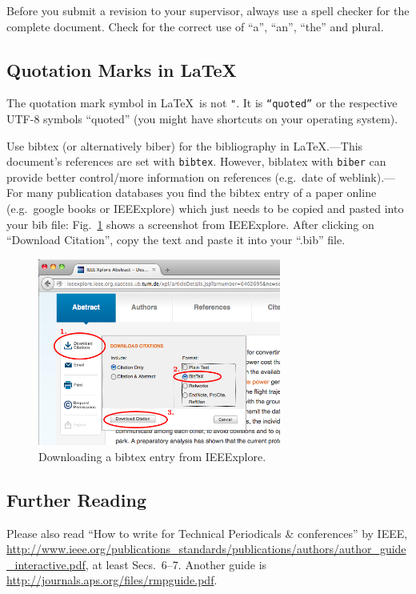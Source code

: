 \documentclass[journal]{IEEEtran}
\begin{document}
Before you submit a revision to your supervisor, always use a spell checker for the complete document. Check for the correct use of “a”, “an”, “the” and plural.

\subsection{Quotation Marks in \LaTeX}

The quotation mark symbol in \LaTeX\ is not \texttt{"}. It is \texttt{``quoted''} or the respective UTF-8 symbols “quoted” (you might have shortcuts on your operating system).

Use bibtex (or alternatively biber) for the bibliography in \LaTeX{}.---This document's references are set with \texttt{bibtex}. However, biblatex with \texttt{biber} can provide better control/more information on references (e.g.\ date of weblink).---For many publication databases you find the bibtex entry of a paper online (e.g.\ google books or IEEExplore) which just needs to be copied and pasted into your bib file: Fig.~\ref{IEEExplore.png} shows a screenshot from IEEExplore. After clicking on “Download Citation”, copy the text and paste it into your “.bib” file.

\begin{figure}[h!]
	\centering
	\includegraphics[width=8cm]{Images/IEEExplore.png}
	\caption{Downloading a bibtex entry from IEEExplore.}
	\label{IEEExplore.png}
\end{figure}


\subsection{Further Reading}

Please also read “How to write for Technical Periodicals \& conferences” by IEEE, \url{http://www.ieee.org/publications_standards/publications/authors/author_guide_interactive.pdf}, at least Secs.~6--7. Another guide is \url{http://journals.aps.org/files/rmpguide.pdf}.
\end{document}
